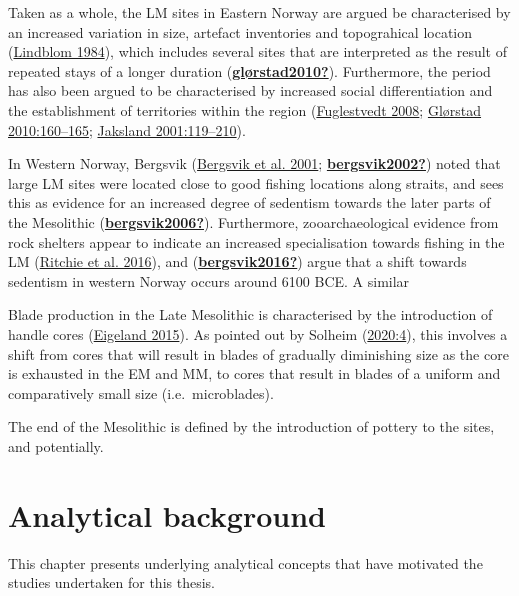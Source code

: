 \documentclass[
  a4paper,
  oneside]{uiophdthesis}
\begin{document}
Taken as a whole, the LM sites in Eastern Norway are argued be characterised by an increased variation in size, artefact inventories and topograhical location (\protect\hyperlink{ref-lindblom1984}{Lindblom 1984}), which includes several sites that are interpreted as the result of repeated stays of a longer duration (\protect\hyperlink{ref-gluxf8rstad2010}{\textbf{glørstad2010?}}). Furthermore, the period has also been argued to be characterised by increased social differentiation and the establishment of territories within the region (\protect\hyperlink{ref-fuglestvedt2008}{Fuglestvedt 2008}; \protect\hyperlink{ref-glorstad2010}{Glørstad 2010:160--165}; \protect\hyperlink{ref-jaksland2001}{Jaksland 2001:119--210}).

In Western Norway, Bergsvik (\protect\hyperlink{ref-bergsvik2001}{Bergsvik et al. 2001}; \protect\hyperlink{ref-bergsvik2002}{\textbf{bergsvik2002?}}) noted that large LM sites were located close to good fishing locations along straits, and sees this as evidence for an increased degree of sedentism towards the later parts of the Mesolithic (\protect\hyperlink{ref-bergsvik2006}{\textbf{bergsvik2006?}}). Furthermore, zooarchaeological evidence from rock shelters appear to indicate an increased specialisation towards fishing in the LM (\protect\hyperlink{ref-ritchie2016}{Ritchie et al. 2016}), and (\protect\hyperlink{ref-bergsvik2016}{\textbf{bergsvik2016?}}) argue that a shift towards sedentism in western Norway occurs around 6100 BCE. A similar

Blade production in the Late Mesolithic is characterised by the introduction of handle cores (\protect\hyperlink{ref-eigeland2015}{Eigeland 2015}). As pointed out by Solheim (\protect\hyperlink{ref-solheim2020}{2020:4}), this involves a shift from cores that will result in blades of gradually diminishing size as the core is exhausted in the EM and MM, to cores that result in blades of a uniform and comparatively small size (i.e.~microblades).

The end of the Mesolithic is defined by the introduction of pottery to the sites, and potentially.

\hypertarget{analytical-background}{%
\section{Analytical background}\label{analytical-background}}

This chapter presents underlying analytical concepts that have motivated the studies undertaken for this thesis.
\end{document}
